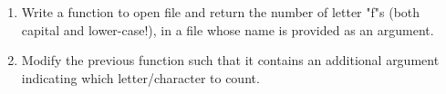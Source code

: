 \documentclass{article}[12pt]
\newcommand{\code}[1]{\texttt{#1}}  %
\begin{document}
\begin{enumerate}
	\item Write a function to open file and return the number of letter "f"\textquotesingle s (both capital and lower-case!), in a file whose name is provided as an argument. 

	\item Modify the previous function such that it contains an additional argument indicating which letter/character to count.
	
\end{enumerate}


%	
%
%
\end{document}
